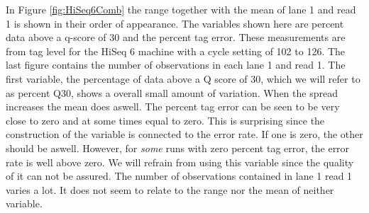 \documentclass[a4paper,11pt,fleqn,twoside,notitlepage]{report}
\begin{document}
In Figure \ref{fig:HiSeq6Comb} the range together with the mean of lane 1 and read 1 is shown in their order of appearance. The variables shown here are percent data above a q-score of 30 and the percent tag error. These measurements are from tag level for the HiSeq 6 machine with a cycle setting of 102 to 126. The last figure contains the number of observations in each lane 1 and read 1. %
The first variable, the percentage of data above a Q score of 30, which we will refer to as percent Q30, shows a overall small amount of variation. When the spread increases the mean does aswell. The percent tag error can be seen to be very close to zero and at some times equal to zero. This is surprising since the construction of the variable is connected to the error rate. If one is zero, the other should be aswell. However, for \textit{some} runs with zero percent tag error, the error rate is well above zero. We will refrain from using this variable since the quality of it can not be assured. The number of observations contained in lane 1 read 1 varies a lot. It does not seem to relate to the range nor the mean of neither variable.
\end{document}
